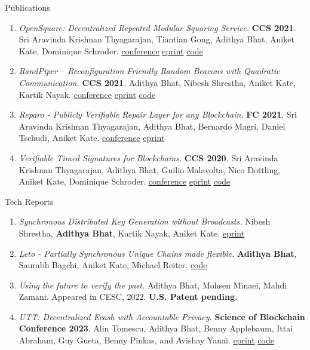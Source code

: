\documentclass{resume}
\begin{document}
\begin{rSection}{Publications}
\begin{enumerate}
\item \emph{OpenSquare: Decentralized Repeated Modular Squaring Service.} \textbf{CCS 2021}. Sri Aravinda Krishnan Thyagarajan, Tiantian Gong, Adithya Bhat, Aniket Kate, Dominique Schroder. \href{https://dl.acm.org/doi/10.1145/3460120.3484809}{conference} \href{https://eprint.iacr.org/2021/1273}{eprint} \href{https://github.com/verifiable-timed-signatures/OpenSquare}{code}
\item \label{org40d7006} \emph{RandPiper – Reconfiguration Friendly Random Beacons with Quadratic Communication.} \textbf{CCS 2021}. Adithya Bhat, Nibesh Shrestha, Aniket Kate, Kartik Nayak. \href{https://dl.acm.org/doi/abs/10.1145/3460120.3484574}{conference} \href{https://eprint.iacr.org/2020/1590.pdf}{eprint} \href{https://github.com/zhtluo/randpiper-rs}{code}
\item \label{org7de989c} \emph{Reparo - Publicly Verifiable Repair Layer for any Blockchain.} \textbf{FC 2021}. Sri Aravinda Krishnan Thyagarajan, Adithya Bhat, Bernardo Magri, Daniel Tschudi, Aniket Kate. \href{https://fc21.ifca.ai/papers/119.pdf}{conference} \href{https://arxiv.org/abs/2001.00486}{eprint}
\item \label{orgb3047d8} \emph{Verifiable Timed Signatures for Blockchains.} \textbf{CCS 2020}. Sri Aravinda Krishnan Thyagarajan, Adithya Bhat, Guilio Malavolta, Nico Dottling, Aniket Kate, Dominique Schroder. \href{https://dl.acm.org/doi/10.1145/3372297.3417263}{conference} \href{https://eprint.iacr.org/2020/1563.pdf}{eprint} \href{https://github.com/verifiable-timed-signatures/liblhtlp}{code}
\end{enumerate}
\end{rSection}
\begin{rSection}{Tech Reports}
\label{sec:org44c4a44}
\begin{enumerate}
\item \label{org5025cfb} \emph{Synchronous Distributed Key Generation without Broadcasts.} Nibesh Shrestha, \textbf{Adithya Bhat}, Kartik Nayak, Aniket Kate. \href{https://eprint.iacr.org/2021/1635}{eprint}
\item \label{orgd23fc1b} \emph{Leto - Partially Synchronous Unique Chains made flexible.} \textbf{Adithya Bhat}, Saurabh Bagchi, Aniket Kate, Michael Reiter. \href{https://github.com/libdist-rs/leto-rs}{code}
\item \label{orgc62de0e} \emph{Using the future to verify the past.} Adithya Bhat, Mohsen Minaei, Mahdi Zamani. Appeared in CESC, 2022. \textbf{U.S. Patent pending.}
\item \label{orgc471416} \emph{UTT: Decentralized Ecash with Accountable Privacy.} \textbf{Science of Blockchain Conference 2023}. Alin Tomescu, Adithya Bhat, Benny Applebaum, Ittai Abraham, Guy Gueta, Benny Pinkas, and Avishay Yanai. \href{https://eprint.iacr.org/2022/452}{eprint} \href{https://github.com/definitelyNotFBI/utt}{code}
\end{enumerate}
\end{rSection}
\end{document}
